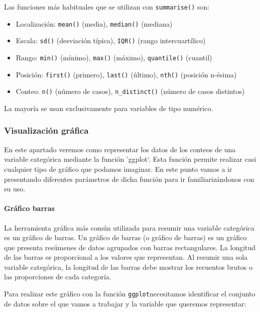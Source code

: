 \documentclass[
]{book}
\providecommand{\tightlist}{%
  \setlength{\itemsep}{0pt}\setlength{\parskip}{0pt}}
\begin{document}
Las funciones más habituales que se utilizan con \texttt{summarise()} son:

\begin{itemize}
\tightlist
\item
  Localización: \texttt{mean()} (media), \texttt{median()} (mediana)
\item
  Escala: \texttt{sd()} (desviación típica), \texttt{IQR()} (rango intercuartílico)
\item
  Rango: \texttt{min()} (mínimo), \texttt{max()} (máximo), \texttt{quantile()} (cuantil)
\item
  Posición: \texttt{first()} (primero), \texttt{last()} (último), \texttt{nth()} (posición n-ésima)
\item
  Conteo: \texttt{n()} (número de casos), \texttt{n\_distinct()} (número de casos distintos)
\end{itemize}

La mayoría se usan exclusivamente para variables de tipo numérico.

\hypertarget{visualizaciuxf3n-gruxe1fica}{%
\subsubsection{Visualización gráfica}\label{visualizaciuxf3n-gruxe1fica}}

En este apartado veremos como representar los datos de los conteos de una variable categórica mediante la función 'ggplot`. Esta función permite realizar casi cualquier tipo de gráfico que podamos imaginar. En este punto vamos a ir presentando diferentes parámetros de dicha función para ir familiarizándonos con su uso.

\hypertarget{gruxe1fico-barras}{%
\paragraph{Gráfico barras}\label{gruxe1fico-barras}}

La herramienta gráfica más común utilizada para resumir una variable categórica es un gráfico de barras. Un gráfico de barras (o gráfico de barras) es un gráfico que presenta resúmenes de datos agrupados con barras rectangulares. La longitud de las barras es proporcional a los valores que representan. Al resumir una sola variable categórica, la longitud de las barras debe mostrar los recuentos brutos o las proporciones de cada categoría.

Para realizar este gráfico con la función \texttt{ggplot}necesitamos identificar el conjunto de datos sobre el que vamos a trabajar y la variable que queremos representar:
\end{document}
